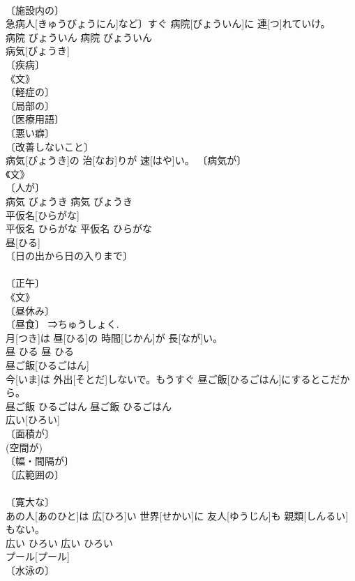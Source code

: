 \documentclass[8pt]{extreport}
\begin{document}
\begin{CJK}{UTF8}{min}
\\	〔施設内の〕 
\\	急病人[きゅうびょうにん]など〕すぐ 病院[びょういん]に 連[つ]れていけ。	
\\	病院	びょういん	病院	びょういん	
\\	病気[びょうき]	
\\	〔疾病〕 
\\	《文》 
\\	〔軽症の〕 
\\	〔局部の〕 
\\	〔医療用語〕 
\\	〔悪い癖〕 
\\	〔改善しないこと〕 
\\	病気[びょうき]の 治[なお]りが 速[はや]い。	〔病気が〕 
\\	《文》 
\\	〔人が〕 
\\	病気	びょうき	病気	びょうき	
\\	平仮名[ひらがな]	
\\	[⇒かな]			平仮名	ひらがな	平仮名	ひらがな	
\\	昼[ひる]	
\\	〔日の出から日の入りまで〕 
\\	[⇒ひるま] 
\\	〔正午〕 
\\	《文》 
\\	〔昼休み〕 
\\	〔昼食〕 ⇒ちゅうしょく.	
\\	月[つき]は 昼[ひる]の 時間[じかん]が 長[なが]い。	
\\	昼	ひる	昼	ひる	
\\	昼ご飯[ひるごはん]	
\\	今[いま]は 外出[そとだ]しないで。もうすぐ 昼ご飯[ひるごはん]にするとこだから。	
\\	昼ご飯	ひるごはん	昼ご飯	ひるごはん	
\\	広い[ひろい]	
\\	〔面積が〕 
\\	(空間が) 
\\	〔幅・間隔が〕 
\\	〔広範囲の〕 
\\	[⇒ひろく２, ひろし] 
\\	〔寛大な〕 
\\	あの人[あのひと]は 広[ひろ]い 世界[せかい]に 友人[ゆうじん]も 親類[しんるい]もない。	
\\	広い	ひろい	広い	ひろい	
\\	プール[プール]	
\\	〔水泳の〕 

\end{CJK}
\end{document}

